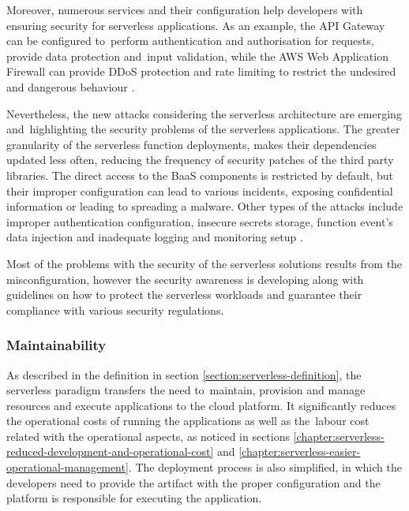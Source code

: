 Moreover, numerous services and their configuration help developers with ensuring security for serverless applications. As an example, the API Gateway can be configured to~perform authentication and authorisation for requests, provide data protection and~input validation, while the AWS Web Application Firewall can provide DDoS protection and rate limiting to restrict the undesired and dangerous behaviour \cite{EvaluationOfServerlessApplicationProgrammingModel}.

Nevertheless, the new attacks considering the serverless architecture are emerging and~highlighting the security problems of the serverless applications. The greater granularity of the serverless function deployments, makes their dependencies updated less often, reducing the frequency of security patches of the third party libraries.
The direct access to the BaaS components is restricted by default, but their improper configuration can lead to various incidents, exposing confidential information or leading to spreading a malware.
Other types of the attacks include improper authentication configuration, insecure secrets storage, function event’s data injection and inadequate logging and monitoring setup \cite{EvaluationOfServerlessApplicationProgrammingModel}.

Most of the problems with the security of the serverless solutions results from the misconfiguration, however the security awareness is developing along with guidelines on how to protect the serverless workloads and guarantee their compliance with various security regulations.

\subsubsection{Maintainability} \label{chapter:serverless-suitability-maintainability}

As described in the definition in section \ref{section:serverless-definition}, the serverless paradigm transfers the need to~maintain, provision and manage resources and execute applications to the cloud platform. It significantly reduces the operational costs of running the applications as well as the~labour cost related with the operational aspects, as noticed in sections \ref{chapter:serverless-reduced-development-and-operational-cost} and \ref{chapter:serverless-easier-operational-management}. The deployment process is also simplified, in which the developers need to provide the artifact with the proper configuration and the platform is responsible for executing the application.

